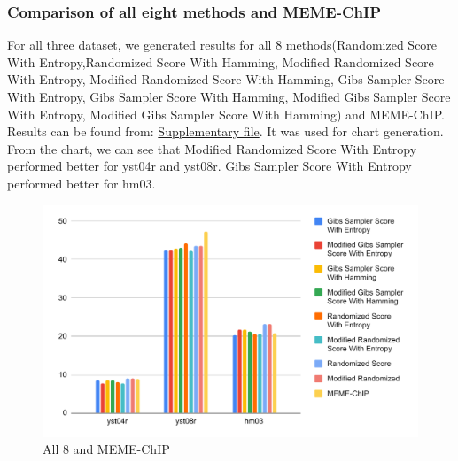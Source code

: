 \documentclass{article}
\begin{document}
\subsubsection{Comparison of all eight methods and MEME-ChIP}
For all three dataset, we generated results for all 8 methods(Randomized Score With Entropy,Randomized Score With Hamming, Modified Randomized Score With Entropy, Modified Randomized Score With Hamming, Gibs Sampler Score With Entropy, Gibs Sampler Score With Hamming, Modified Gibs Sampler Score With Entropy, Modified Gibs Sampler Score With Hamming) and MEME-ChIP. Results can be found from: \href{https://docs.google.com/spreadsheets/d/1NLuWuYod4BafkorDmi3lj8y2_z9ZDeY42Y-eZODlBIA/edit#gid=1341543901}{Supplementary file}. It was used for chart generation.\\
From the chart, we can see that Modified Randomized
Score With Entropy performed better for yst04r and yst08r. Gibs Sampler Score
With Entropy performed better for hm03.
\begin{figure}[!hptb]
    \centering
    \includegraphics[scale=0.7]{Figs/chart_MEME-ChIP.pdf}
    \caption{All 8 and MEME-ChIP}    
\end{figure}
\clearpage
\end{document}
